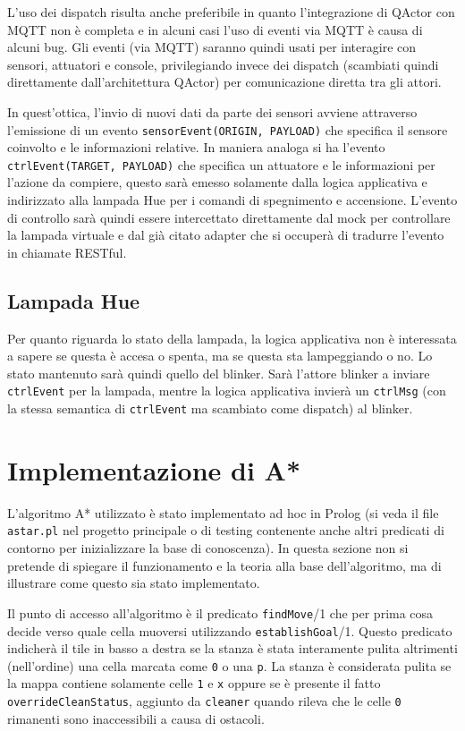 L'uso dei dispatch risulta anche preferibile in quanto l'integrazione di QActor con MQTT non è completa e in alcuni casi l'uso di eventi via MQTT è causa di alcuni bug. Gli eventi (via MQTT) saranno quindi usati per interagire con sensori, attuatori e console, privilegiando invece dei dispatch (scambiati quindi direttamente dall'architettura QActor) per comunicazione diretta tra gli attori.

In quest'ottica, l'invio di nuovi dati da parte dei sensori avviene attraverso l'emissione di un evento \texttt{sensorEvent(ORIGIN, PAYLOAD)} che specifica il sensore coinvolto e le informazioni relative. In maniera analoga si ha l'evento \texttt{ctrlEvent(TARGET, PAYLOAD)} che specifica un attuatore e le informazioni per l'azione da compiere, questo sarà emesso solamente dalla logica applicativa e indirizzato alla lampada Hue per i comandi di spegnimento e accensione. L'evento di controllo sarà quindi essere intercettato direttamente dal mock per controllare la lampada virtuale e dal già citato adapter che si occuperà di tradurre l'evento in chiamate RESTful.

\subsection{Lampada Hue}
Per quanto riguarda lo stato della lampada, la logica applicativa non è interessata a sapere se questa è accesa o spenta, ma se questa sta lampeggiando o no. Lo stato mantenuto sarà quindi quello del blinker. Sarà l'attore blinker a inviare \texttt{ctrlEvent} per la lampada, mentre la logica applicativa invierà un \texttt{ctrlMsg} (con la stessa semantica di \texttt{ctrlEvent} ma scambiato come dispatch) al blinker.

\section{Implementazione di A*}\label{prt:astar_prolog}
L'algoritmo A* utilizzato è stato implementato ad hoc in Prolog (si veda il file \texttt{astar.pl} nel progetto principale o di testing contenente anche altri predicati di contorno per inizializzare la base di conoscenza). In questa sezione non si pretende di spiegare il funzionamento e la teoria alla base dell'algoritmo, ma di illustrare come questo sia stato implementato.

Il punto di accesso all'algoritmo è il predicato \texttt{findMove}/1 che per prima cosa decide verso quale cella muoversi utilizzando \texttt{establishGoal}/1. Questo predicato indicherà il tile in basso a destra se la stanza è stata interamente pulita altrimenti (nell'ordine) una cella marcata come \texttt{0} o una \texttt{p}.
La stanza è considerata pulita se la mappa contiene solamente celle \texttt{1} e \texttt{x} oppure se è presente il fatto \texttt{overrideCleanStatus}, aggiunto da \texttt{cleaner} quando rileva che le celle \texttt{0} rimanenti sono inaccessibili a causa di ostacoli.

